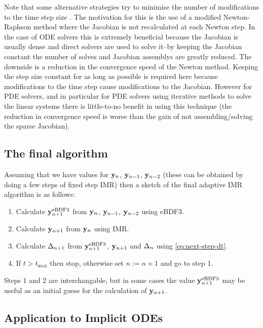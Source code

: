 Note that some alternative strategies try to minimise the number of modifications to the time step size \cite[chap. 6]{Iserles2009} \cite[Sec. 2.1]{cvode-manual}.
The motivation for this is the use of a modified Newton-Raphson method where the Jacobian is not recalculated at each Newton step.
In the case of ODE solvers this is extremely beneficial because the Jacobian is usually dense and direct solvers are used to solve it--by keeping the Jacobian constant the number of solves and Jacobian assemblys are greatly reduced.
The downside is a reduction in the convergence speed of the Newton method.
Keeping the step size constant for as long as possible is required here because modifications to the time step cause modifications to the Jacobian.
However for PDE solvers, and in particular for PDE solvers using iterative methods to solve the linear systems there is little-to-no benefit in using this technique (the reduction in convergence speed is worse than the gain of not assembling/solving the sparse Jacobian)\cite[128]{Iserles2009}.


\subsection{The final algorithm}

Assuming that we have values for $\mathbf{y}_n$, $\mathbf{y}_{n-1}$, $\mathbf{y}_{n-2}$ (these can be obtained \eg by doing a few steps of fixed step IMR) then a sketch of the final adaptive IMR algorithm is as follows:
\begin{enumerate}
\item Calculate $\mathbf{y}_{n+1}^{\text{eBDF3}}$ from $\mathbf{y}_n$, $\mathbf{y}_{n-1}$, $\mathbf{y}_{n-2}$ using eBDF3.
\item Calculate $\mathbf{y}_{n+1}$ from $\mathbf{y}_n$ using IMR.
\item Calculate $\Delta_{n+1}$ from $\mathbf{y}_{n+1}^{\text{eBDF3}}$, $\mathbf{y}_{n+1}$ and $\Delta_{n}$ using
  \cref{eq:next-step-dt}.
\item If $t > t_{\text{max}}$ then stop, otherwise set $n := n+1$ and go to step 1.
\end{enumerate}

Steps 1 and 2 are interchangable, but in some cases the value $\mathbf{y}_{n+1}^{\text{eBDF3}}$ may be useful as an initial guess for the calculation of $\mathbf{y}_{n+1}$.


\subsection{Application to Implicit ODEs}
\label{sec:extens-impl-odes}


